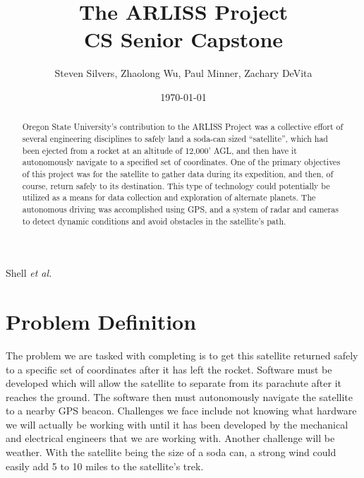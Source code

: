\documentclass[10pt,onecolumn,draftclsnofoot,journal]{IEEEtran}
\title{The ARLISS Project \\
	\large CS Senior Capstone}
\author{Steven Silvers, Zhaolong Wu, Paul Minner, Zachary DeVita}
\date{\today}
\begin{document}

%
{Shell \MakeLowercase{\textit{et al.}}}
\maketitle
\begin{abstract}
\noindent Oregon State University’s contribution to the ARLISS Project was a collective effort of several engineering disciplines to safely land a soda-can sized “satellite”, which had been ejected from a rocket at an altitude of 12,000’ AGL, and then have it autonomously navigate to a specified set of coordinates. One of the primary objectives of this project was for the satellite to gather data during its expedition, and then, of course, return safely to its destination. This type of technology could potentially be utilized as a means for data collection and exploration of alternate planets. The autonomous driving was accomplished using GPS, and a system of radar and cameras to detect dynamic conditions and avoid obstacles in the satellite’s path.
\end{abstract}


\clearpage


\newpage
{}

\section*{\textbf{Problem Definition}}
\noindent The problem we are tasked with completing is to get this satellite returned safely to a specific set of coordinates after it has left the rocket. Software must be developed which will allow the satellite to separate from its parachute after it reaches the ground. The software then must autonomously navigate the satellite to a nearby GPS beacon. Challenges we face include not knowing what hardware we will actually be working with until it has been developed by the mechanical and electrical engineers that we are working with. Another challenge will be weather. With the satellite being the size of a soda can, a strong wind could easily add 5 to 10 miles to the satellite’s trek.
\end{document}
